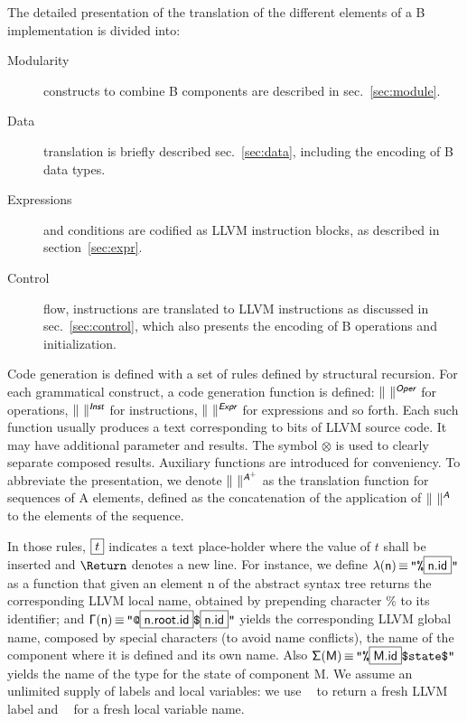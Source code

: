 \documentclass{llncs}
\newcommand{\trad}[2]{\ensuremath{\lVert \textsf{#1} \rVert^{\textit{#2}}}}
\newcommand{\nl}[0]{\text{\Return}}
\DeclareMathOperator{\isdef}{\equiv}
\DeclareMathOperator{\lbl}{\mathcal{L}()}
\DeclareMathOperator{\variable}{\mathcal{V}()}
\newcommand{\llvm}[1]{\texttt{#1}}
\newcommand{\B}[1]{\textsf{#1}}
\newcommand{\ListOf}[1]{$\mbox{#1}^+$}
\newcommand{\PH}[1]{\framebox{$#1$}}
\newcommand{\sep}[0]{\otimes}
\newcommand{\Global}[0]{\ensuremath{\sf\Gamma}}
\newcommand{\local}[0]{\ensuremath{\sf\lambda}}
\newcommand{\state}[0]{\ensuremath{\sf\Sigma}}
\begin{document}
The detailed presentation of the translation of the different elements of a B
implementation is divided into:
\begin{description}
\item[Modularity] constructs to combine B components are described in
  sec.~\ref{sec:module}.
\item[Data] translation is briefly described sec.~\ref{sec:data}, including
  the encoding of B data types.
\item[Expressions] and conditions are codified as LLVM instruction blocks, as
  described in section~\ref{sec:expr}.
\item[Control] flow, instructions are translated to LLVM instructions as
  discussed in sec.~\ref{sec:control}, which also presents the encoding
  of B operations and initialization.
\end{description}

Code generation is defined with a set of rules defined by structural
recursion. For each grammatical construct, a code generation function is
defined: $\trad{~}{\B{Oper}}$ for operations, $\trad{~}{\B{Inst}}$ for
instructions, $\trad{~}{\B{Expr}}$ for expressions and so forth. Each such
function usually produces a text corresponding to bits of LLVM source code. It
may have additional parameter and results. The symbol $\sep$ is used to clearly
separate composed results. Auxiliary functions are introduced for
conveniency. To abbreviate the presentation, we denote
$\trad{~}{\ListOf{\B{A}}}$ as the translation function for sequences of \B{A}
elements, defined as the concatenation of the application of $\trad{~}{\B{A}}$
to the elements of the sequence.

In those rules, $\PH{t}$ indicates a text place-holder where the value of $t$
shall be inserted and $\nl$ denotes a new line. For instance, we define
$\local(\B{n}) \isdef \llvm{"\%\PH{\B{n.id}}"}$ as a function that given an
element \B{n} of the abstract syntax tree returns the corresponding LLVM local
name, obtained by prepending character \% to its identifier; and $\Global(\B{n})
\isdef \llvm{"@\PH{\B{n.root.id}}\$\PH{\B{n.id}}"}$ yields the corresponding
LLVM global name, composed by special characters (to avoid name conflicts), the
name of the component where it is defined and its own name. Also $\state(\B{M})
\isdef \llvm{"\%\PH{\B{M.id}}\$state\$"}$ yields the name of the type for the
state of component \B{M}. We assume an unlimited supply of labels and local
variables: we use $\lbl$ to return a fresh LLVM label and $\variable$ for a
fresh local variable name.
\end{document}

